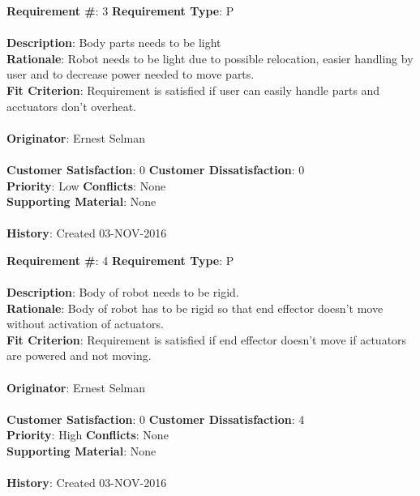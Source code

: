 \documentclass[titlepage]{article}
\begin{document}
\begin{framed}
	\noindent\textbf{Requirement \#}: 3 \hfill \textbf{Requirement Type}: P \hfill\\\\
	\noindent\textbf{Description}: Body parts needs to be light \\
	\textbf{Rationale}: Robot needs to be light due to possible relocation, easier handling by user and to decrease power needed to move parts. \\
	\textbf{Fit Criterion}: Requirement is satisfied if user can easily handle parts and acctuators don't overheat. \\\\
	\textbf{Originator}: Ernest Selman\\\\
	\noindent\textbf{Customer Satisfaction}: 0 \hfill 	\textbf{Customer Dissatisfaction}: 0 \hfill\\
	\textbf{Priority}: Low \hfill \textbf{Conflicts}: None \hfill\\
	\textbf{Supporting Material}: None\\\\
	\noindent\textbf{History}: Created 03-NOV-2016
\end{framed}

\begin{framed}
	\noindent\textbf{Requirement \#}: 4 \hfill \textbf{Requirement Type}: P \hfill\\\\
	\noindent\textbf{Description}: Body of robot needs to be rigid. \\
	\textbf{Rationale}: Body of robot has to be rigid so that end effector doesn't move without activation of actuators. \\
	\textbf{Fit Criterion}: Requirement is satisfied if end effector doesn't move if actuators are powered and not moving.\\\\
	\textbf{Originator}: Ernest Selman\\\\
	\noindent\textbf{Customer Satisfaction}: 0 \hfill 	\textbf{Customer Dissatisfaction}: 4 \hfill\\
	\textbf{Priority}: High \hfill \textbf{Conflicts}: None \hfill\\
	\textbf{Supporting Material}: None\\\\
	\noindent\textbf{History}: Created 03-NOV-2016
\end{framed}
\end{document}
